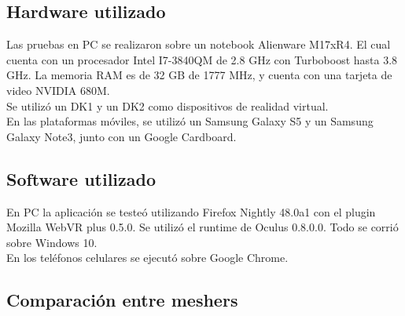 \documentclass[12pt]{article}
\begin{document}
\subsection{Hardware utilizado}
Las pruebas en PC se realizaron sobre un notebook Alienware M17xR4. El cual cuenta con un procesador Intel I7-3840QM de 2.8 GHz con Turboboost hasta 3.8 GHz. La memoria RAM es de 32 GB de 1777 MHz, y cuenta con una tarjeta de video NVIDIA 680M.
\\Se utilizó un DK1 y un DK2 como dispositivos de realidad virtual.
\\En las plataformas móviles, se utilizó un Samsung  Galaxy S5 y un Samsung  Galaxy Note3, junto con un Google Cardboard. 

\subsection{Software utilizado}
En PC la aplicación se testeó utilizando Firefox Nightly 48.0a1 con el plugin Mozilla WebVR plus 0.5.0. Se utilizó el runtime de Oculus 0.8.0.0. Todo se corrió sobre Windows 10.
\\En los teléfonos celulares se ejecutó sobre Google Chrome.

\subsection{Comparación entre meshers}
\end{document}
